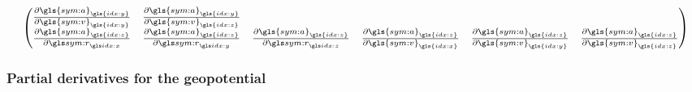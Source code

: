 \begin{equation}
\begin{pmatrix}
    \frac{\partial \gls{sym:a}_{\gls{idx:y}}}{\partial \gls{sym:v}_{\gls{idx:y}}} &
    \frac{\partial \gls{sym:a}_{\gls{idx:y}}}{\partial \gls{sym:v}_{\gls{idx:z}}} \\
    \frac{\partial \gls{sym:a}_{\gls{idx:z}}}{\partial \rx} &
    \frac{\partial \gls{sym:a}_{\gls{idx:z}}}{\partial \ry} & 
    \frac{\partial \gls{sym:a}_{\gls{idx:z}}}{\partial \rz} &
    \frac{\partial \gls{sym:a}_{\gls{idx:z}}}{\partial \gls{sym:v}_{\gls{idx:x}}} &
    \frac{\partial \gls{sym:a}_{\gls{idx:z}}}{\partial \gls{sym:v}_{\gls{idx:y}}} &
    \frac{\partial \gls{sym:a}_{\gls{idx:z}}}{\partial \gls{sym:v}_{\gls{idx:z}}}    
  \end{pmatrix} \label{eq:partial-derivative-matrix}
\end{equation}

\subsubsection{Partial derivatives for the geopotential}
\label{sec:propagation-covariance-set-integration-geopotential}

